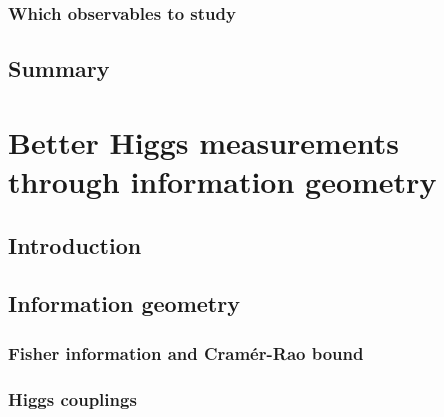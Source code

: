 \subsection{Which observables to study}

\section{Summary}
\label{sec:validity_summary}





\chapter{Better Higgs measurements through information geometry}
\label{chapter:information}


\section{Introduction}
\label{sec:information_intro}

\section{Information geometry}
\label{sec:information_formalism}

\subsection{Fisher information and Cram\'er-Rao bound}

\subsection{Higgs couplings}



